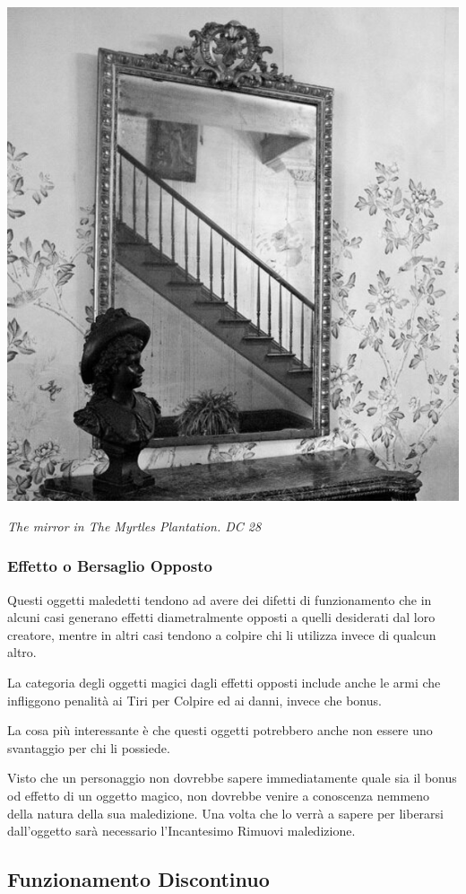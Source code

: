 \begin{multicols}{2}
\medskip

\begin{center}
\includegraphics[width=0.70\linewidth]{immagini/mirror.png}

\emph{The mirror in The Myrtles Plantation. DC 28}
\end{center}

\subsubsection{Effetto o Bersaglio Opposto}

Questi oggetti maledetti tendono ad avere dei difetti di funzionamento che in alcuni casi generano effetti diametralmente opposti a quelli desiderati dal loro creatore, mentre in altri casi tendono a colpire chi li utilizza invece di qualcun altro.

La categoria degli oggetti magici dagli effetti opposti include anche le armi che infliggono penalità ai Tiri per Colpire ed ai danni, invece che bonus.

La cosa più interessante è che questi oggetti potrebbero anche non essere uno svantaggio per chi li possiede.

Visto che un personaggio non dovrebbe sapere immediatamente quale sia il bonus od effetto di un oggetto magico, non dovrebbe venire a conoscenza nemmeno della natura della sua maledizione. Una volta che lo verrà a sapere per liberarsi dall'oggetto sarà necessario l'Incantesimo Rimuovi maledizione.

\subsection{Funzionamento Discontinuo}


\end{multicols}
